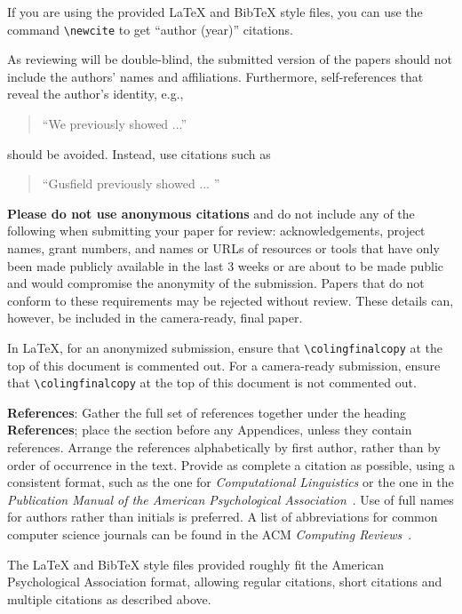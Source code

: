 \documentclass[11pt]{article}
\begin{document}
If you are using the provided \LaTeX{} and Bib\TeX{} style files, you
can use the command \verb|\newcite| to get ``author (year)'' citations.

As reviewing will be double-blind, the submitted version of the papers
should not include the authors' names and affiliations. Furthermore,
self-references that reveal the author's identity, e.g.,
\begin{quote}
``We previously showed \cite{Gusfield:97} ...''  
\end{quote}
should be avoided. Instead, use citations such as 
\begin{quote}
``Gusfield 
previously showed ... ''
\end{quote}

\textbf{Please do not use anonymous citations} and do not include
any of the following when submitting your paper for review:
acknowledgements, project names, grant numbers, and names or URLs of
resources or tools that have only been made publicly available in
the last 3 weeks or are about to be made public and would compromise the anonymity of the submission.
Papers that do not
conform to these requirements may be rejected without review.
These details can, however, be included in the camera-ready, final paper.

In \LaTeX{}, for an anonymized submission, ensure that {\small\verb|\colingfinalcopy|} at the top of this document is commented out.
For a camera-ready submission, ensure that {\small\verb|\colingfinalcopy|} at the top of this document is not commented out.


\textbf{References}: Gather the full set of references together under
the heading {\bf References}; place the section before any Appendices,
unless they contain references. Arrange the references alphabetically
by first author, rather than by order of occurrence in the text.
Provide as complete a citation as possible, using a consistent format,
such as the one for {\em Computational Linguistics\/} or the one in the 
{\em Publication Manual of the American 
Psychological Association\/}~\cite{APA:83}.  Use of full names for
authors rather than initials is preferred.  A list of abbreviations
for common computer science journals can be found in the ACM 
{\em Computing Reviews\/}~\cite{ACM:83}.

The \LaTeX{} and Bib\TeX{} style files provided roughly fit the
American Psychological Association format, allowing regular citations, 
short citations and multiple citations as described above.
\end{document}
